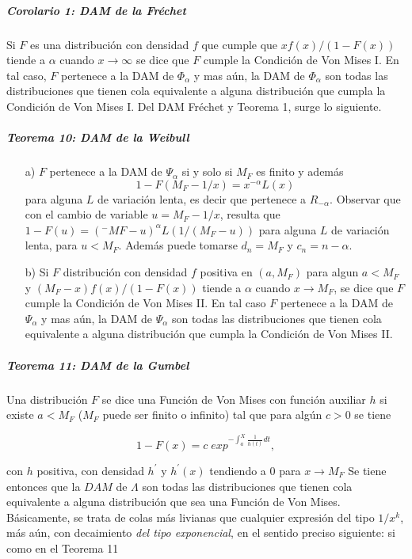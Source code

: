 \documentclass[
  12pt]{article}
\begin{document}
\hypertarget{corolario-1-dam-de-la-fruxe9chet}{%
\subparagraph{Corolario 1: DAM de la
Fréchet}\label{corolario-1-dam-de-la-fruxe9chet}}

Si \(F\) es una distribución con densidad \(f\) que cumple que
\(xf(x)/(1-F(x))\) tiende a \(\alpha\) cuando \(x \rightarrow \infty\)
se dice que \(F\) cumple la Condición de Von Mises I. En tal caso, \(F\)
pertenece a la DAM de \(\Phi_{\alpha}\) y mas aún, la DAM de
\(\Phi_{\alpha}\) son todas las distribuciones que tienen cola
equivalente a alguna distribución que cumpla la Condición de Von Mises
I. Del DAM Fréchet y Teorema 1, surge lo siguiente.

\hypertarget{teorema-10-dam-de-la-weibull}{%
\subparagraph{Teorema 10: DAM de la
Weibull}\label{teorema-10-dam-de-la-weibull}}

\begin{itemize}
\item [a)] $F$ pertenece a la DAM de $\Psi_{\alpha}$ si y solo si $M_F$ es finito y además $$1-F(M_F -1/x)=x^{-\alpha} L(x)$$ para alguna
$L$ de variación lenta, es decir que pertenece a $R_{-\alpha}$. Observar que con el cambio de variable $u=M_F -1/x$,
resulta que $1-F(u)=(^{-}MF -u)^{\alpha} L(1/(M_F -u))$ para alguna $L$ de variación lenta, para $u< M_F$. Además puede tomarse $d_n= M_F$ y $c_n= n-\alpha$.
\item [b)] Si $F$ distribución con densidad $f$ positiva en $(a,M_F)$ para algun $a< M_F$ y $(M_F -x)f(x)/(1-F(x))$ tiende a $\alpha$ cuando $x\rightarrow M_F$, se dice que $F$ cumple la Condición de Von Mises II. En tal caso $F$ pertenece a la DAM de $\Psi_{\alpha}$ y mas aún, la DAM de $\Psi_{\alpha}$ son todas las distribuciones que tienen cola equivalente a alguna distribución que cumpla la Condición de Von Mises II.
\end{itemize}

\hypertarget{teorema-11-dam-de-la-gumbel}{%
\subparagraph{Teorema 11: DAM de la
Gumbel}\label{teorema-11-dam-de-la-gumbel}}

Una distribución \(F\) se dice una Función de Von Mises con función
auxiliar \(h\) si existe \(a < M_F\) (\(M_F\) puede ser finito o
infinito) tal que para algún \(c>0\) se tiene

\[
1-F(x)= c\;exp^{{- \int_a^X \frac{1}{h(t)} dt}},
\]

con \(h\) positiva, con densidad \(h^\prime\) y \(h^\prime(x)\)
tendiendo a \(0\) para \(x\rightarrow M_F\) Se tiene entonces que la
\(DAM\) de \(\Lambda\) son todas las distribuciones que tienen cola
equivalente a alguna distribución que sea una Función de Von Mises.
Básicamente, se trata de colas más livianas que cualquier expresión del
tipo \(1/x^k\), más aún, con decaimiento \textit{del tipo exponencial},
en el sentido preciso siguiente: si como en el Teorema 11
\end{document}
